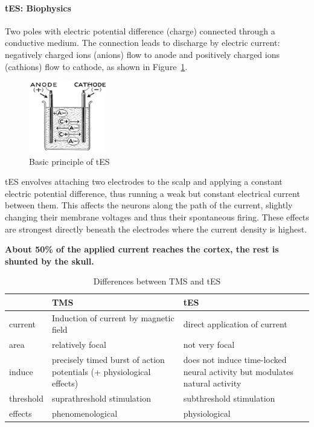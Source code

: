 \documentclass[12pt,article,oneside,a4paper]{memoir}
\begin{document}
\paragraph{tES: Biophysics}
Two poles with electric potential difference (charge) connected through a
conductive medium. The connection leads to discharge by electric current:
negatively charged ions (anions) flow to anode and positively charged ions
(cathions) flow to cathode, as shown in Figure~\ref{fig:tes}.

\begin{figure}
  \centering
  \includegraphics[width=0.3\textwidth]{imgs/tes.png}
  \caption{Basic principle of tES}
  \label{fig:tes}
\end{figure}

tES envolves attaching two electrodes to the scalp and applying a constant
electric potential difference, thus running a weak but constant electrical
current between them. This affects the neurons along the path of the current,
slightly changing their membrane voltages and thus their spontaneous firing.
These effects are strongest directly beneath the electrodes where the current
density is highest.

\textbf{About 50\% of the applied current reaches the cortex, the rest is 
shunted by the skull.}

\begin{table}[h]
  \begin{tabular}{ l |  p{6cm} |  p{6cm} }
    \hline
     & TMS & tES \\ \hline
    current & Induction of current by magnetic field & direct application of
    current \\ \hline
    area & relatively focal & not very focal \\ \hline
    induce & precisely timed burst of action potentials (+ physiological effects) & 
    does not induce time-locked neural activity but modulates natural activity \\ \hline
	threshold & suprathreshold stimulation & subthreshold stimulation \\ \hline
    effects & phenomenological & physiological \\
    \hline
  \end{tabular}
  \caption{Differences between TMS and tES}
\end{table}
\end{document}
